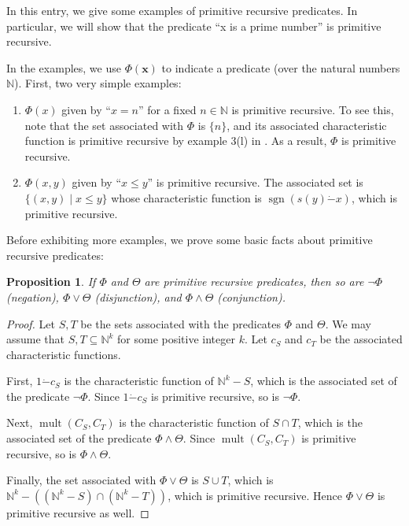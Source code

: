 \documentclass[12pt]{article}
\newtheorem{prop}{Proposition}
\begin{document}
In this entry, we give some examples of primitive recursive predicates.  In particular, we will show that the predicate ``x is a prime number'' is primitive recursive.

In the examples, we use $\Phi(\boldsymbol{x})$ to indicate a predicate (over the natural numbers $\mathbb{N}$).  First, two very simple examples:
\begin{enumerate}
\item $\Phi(x)$ given by ``$x=n$'' for a fixed $n \in \mathbb{N}$ is primitive recursive.  To see this, note that the set associated with $\Phi$ is $\lbrace n\rbrace$, and its associated characteristic function is primitive recursive by example 3(l) in .  As a result, $\Phi$ is primitive recursive.
\item $\Phi(x,y)$ given by ``$x\le y$'' is primitive recursive.  The associated set is $\lbrace (x,y)\mid x\le y\rbrace$ whose characteristic function is $\operatorname{sgn}(s(y)\dot{-}x)$, which is primitive recursive.
\end{enumerate}

Before exhibiting more examples, we prove some basic facts about primitive recursive predicates:
\begin{prop}  If $\Phi$ and $\Theta$ are primitive recursive predicates, then so are $\neg \Phi$ (negation), $\Phi \vee \Theta$ (disjunction), and $\Phi \wedge \Theta$ (conjunction). \end{prop}
\begin{proof}
Let $S,T$ be the sets associated with the predicates $\Phi$ and $\Theta$.  We may assume that $S,T\subseteq \mathbb{N}^k$ for some positive integer $k$.  Let $c_S$ and $c_T$ be the associated characteristic functions.  

First, $1 \dot{-} c_S$ is the characteristic function of $\mathbb{N}^k - S$, which is the associated set of the predicate $\neg \Phi$.  Since $1 \dot{-} c_S$ is primitive recursive, so is $\neg \Phi$.

Next, $\operatorname{mult}(C_S, C_T)$ is the characteristic function of $S\cap T$, which is the associated set of the predicate $\Phi\wedge \Theta$.  Since $\operatorname{mult}(C_S, C_T)$ is primitive recursive, so is $\Phi \wedge \Theta$.

Finally, the set associated with $\Phi \vee \Theta$ is $S \cup T$, which is $\mathbb{N}^k - ((\mathbb{N}^k - S) \cap (\mathbb{N}^k - T))$, which is primitive recursive.  Hence $\Phi \vee \Theta$ is primitive recursive as well.
\end{proof}
\end{document}
